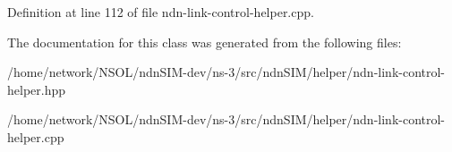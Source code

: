 Definition at line 112 of file ndn-\/link-\/control-\/helper.\+cpp.



The documentation for this class was generated from the following files\+:\begin{DoxyCompactItemize}
\item 
/home/network/\+N\+S\+O\+L/ndn\+S\+I\+M-\/dev/ns-\/3/src/ndn\+S\+I\+M/helper/ndn-\/link-\/control-\/helper.\+hpp\item 
/home/network/\+N\+S\+O\+L/ndn\+S\+I\+M-\/dev/ns-\/3/src/ndn\+S\+I\+M/helper/ndn-\/link-\/control-\/helper.\+cpp\end{DoxyCompactItemize}
